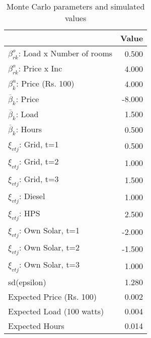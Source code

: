 \begin{table}[!ht]
	\centering
		\caption{Monte Carlo parameters and simulated values}
\begin{tabular}{lr}
		\toprule
               &     Value\\
		\midrule
		$\beta^o_{rk}$: Load x Number of rooms&     0.500\\
		$\beta^o_{rk}$: Price x Inc&     4.000\\
		$\beta^u_{k}$: Price (Rs. 100)&     4.000\\
		$\overline{\beta}_k$: Price&    -8.000\\
		$\overline{\beta}_k$: Load&     1.500\\
		$\overline{\beta}_k$: Hours&     0.500\\
		$\xi_{vtj}$: Grid, t=1&     0.500\\
		$\xi_{vtj}$: Grid, t=2&     1.000\\
		$\xi_{vtj}$: Grid, t=3&     1.500\\
		$\xi_{vtj}$: Diesel&     1.000\\
		$\xi_{vtj}$: HPS&     2.500\\
		$\xi_{vtj}$: Own Solar, t=1&    -2.000\\
		$\xi_{vtj}$: Own Solar, t=2&    -1.500\\
		$\xi_{vtj}$: Own Solar, t=3&     1.000\\
		    sd(epsilon)&     1.280\\
		Expected Price (Rs. 100)&     0.002\\
		Expected Load (100 watts)&     0.004\\
		 Expected Hours&     0.014\\
		\bottomrule
	\end{tabular}
\end{table}
